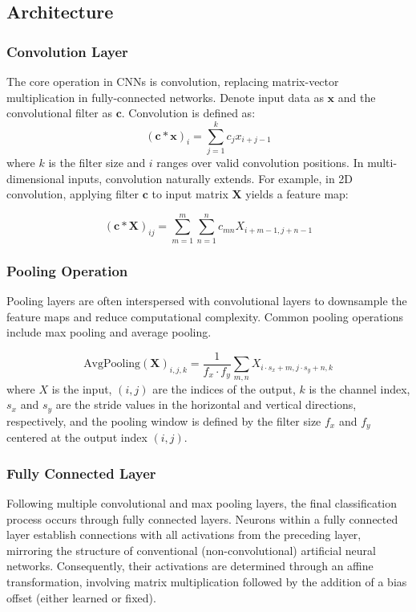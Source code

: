 \documentclass[a4paper]{report}
\begin{document}
{\subsection{Architecture}
\subsubsection{Convolution Layer}
The core operation in CNNs is convolution, replacing matrix-vector multiplication in fully-connected networks. Denote input data as \( \mathbf{x} \) and the convolutional filter as \( \mathbf{c} \). Convolution is defined as:
\[
(\mathbf{c} * \mathbf{x})_i = \sum_{j=1}^{k} c_j x_{i+j-1}
\]
where \( k \) is the filter size and \( i \) ranges over valid convolution positions. In multi-dimensional inputs, convolution naturally extends. For example, in 2D convolution, applying filter \( \mathbf{c} \) to input matrix \( \mathbf{X} \) yields a feature map:

\[
(\mathbf{c} * \mathbf{X})_{ij} = \sum_{m=1}^{m} \sum_{n=1}^{n} c_{mn} X_{i+m-1, j+n-1}
\]


\subsubsection{Pooling Operation}

Pooling layers are often interspersed with convolutional layers to downsample the feature maps and reduce computational complexity. Common pooling operations include max pooling and average pooling.

\[
\text{AvgPooling}(\mathbf{X})_{i,j,k} = \frac{1}{f_x\cdot f_y}\sum_{m,n}X_{i\cdot s_x+m,j\cdot s_y+n,k}
\]
where $X$ is the input, $(i,j)$ are the indices of the output, $k$ is the channel index, $s_x$ and $s_y$ are the stride values in the horizontal and vertical directions, respectively, and the pooling window is defined by the filter size $f_x$ and $f_y$ centered at the output index $(i,j)$.
\subsubsection{Fully Connected Layer}
Following multiple convolutional and max pooling layers, the final classification process occurs through fully connected layers. Neurons within a fully connected layer establish connections with all activations from the preceding layer, mirroring the structure of conventional (non-convolutional) artificial neural networks. Consequently, their activations are determined through an affine transformation, involving matrix multiplication followed by the addition of a bias offset (either learned or fixed).
\begin{figure}[H]
\begin{center}
\end{center}
\end{figure}}
\end{document}
